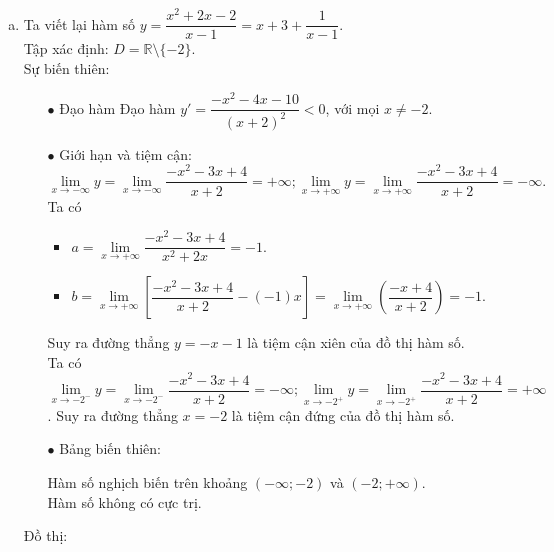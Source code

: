\begin{vd}
{\begin{enumerate}[a)]
	\item Ta viết lại hàm số $ y = \dfrac{x^2+ 2x - 2}{x - 1}=x+3+\dfrac{1}{x-1}$.\\
	Tập xác định: $D=\mathbb{R} \setminus\{-2\}$.\\
	Sự biến thiên:
	\begin{itemize}
		\item [$\bullet$] Đạo hàm Đạo hàm $y'=\dfrac{-x^2-4x-10}{(x+2)^2}<0$, với mọi $x \ne -2$.
		\item [$\bullet$] Giới hạn và tiệm cận:\\
		$$
		\lim\limits_{x \to-\infty} y=\lim\limits_{x \to-\infty} \dfrac{-x^2-3 x+4}{x+2}=+\infty; \lim\limits_{x \to+\infty} y=\lim\limits_{x \to+\infty} \dfrac{-x^2-3 x+4}{x+2}=-\infty.
		$$		
		Ta có 
		\begin{itemize}
			\item $a=\lim\limits_{x \to+\infty} \dfrac{-x^2-3x+4}{x^2+2x}=-1$.
			\item $b=\lim\limits_{x \to+\infty}\left[\dfrac{-x^2-3x+4}{x+2}-(-1) x\right]=\lim\limits_{x \to+\infty}\left(\dfrac{-x+4}{x+2}\right)=-1$.
		\end{itemize}	
		Suy ra đường thẳng $y=-x-1$ là tiệm cận xiên của đồ thị hàm số.\\		
		Ta có $\lim\limits_{x \to-2^{-}} y=\lim\limits_{x \to-2^{-}} \dfrac{-x^2-3x+4}{x+2}=-\infty; \lim\limits_{x \to-2^{+}} y=\lim\limits_{x \to-2^{+}} \dfrac{-x^2-3x+4}{x+2}=+\infty$. Suy ra đường thẳng $x=-2$ là tiệm cận đứng của đồ thị hàm số.
		\item [$\bullet$] Bảng biến thiên:
		\begin{center}
		\end{center}
		Hàm số nghịch biến trên khoảng $(-\infty;-2)$ và $(-2;+\infty)$.\\
		Hàm số không có cực trị.
	\end{itemize}
	Đồ thị:\\
\end{enumerate}}
\end{vd}

